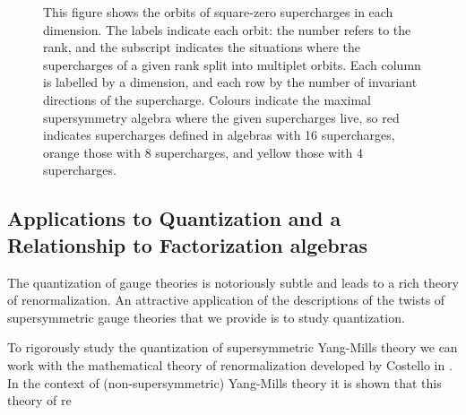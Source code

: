 \documentclass[10pt, oneside]{article}
\begin{document}
\begin{figure}[hbp]
\caption{This figure shows the orbits of square-zero supercharges in each dimension.  The labels indicate each orbit: the number refers to the rank, and the subscript indicates the situations where the supercharges of a given rank split into multiplet orbits.  Each column is labelled by a dimension, and each row by the number of invariant directions of the supercharge.  Colours indicate the maximal supersymmetry algebra where the given supercharges live, so red indicates supercharges defined in algebras with 16 supercharges, orange those with 8 supercharges, and yellow those with 4 supercharges.}
\label{fig:superchargeorbits}
\end{figure}

\subsection*{Applications to Quantization and a Relationship to Factorization algebras}

The quantization of gauge theories is notoriously subtle and leads to a rich theory of renormalization.
An attractive application of the descriptions of the twists of supersymmetric gauge theories that we provide is to study quantization. 

To rigorously study the quantization of supersymmetric Yang-Mills theory we can work with the mathematical theory of renormalization developed by Costello in \cite{CostelloBook}. 
In the context of (non-supersymmetric) Yang-Mills theory it is shown that this theory of re
\end{document}
